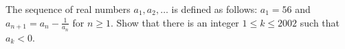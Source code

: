 The sequence of real numbers $a_1,a_2,\dots$ is defined as follows: $a_1=56$ and $a_{n+1}=a_n-\frac{1}{a_n}$ for $n\ge 1$. Show that there is an integer $1\leq{k}\leq2002$ such that $a_k<0$.